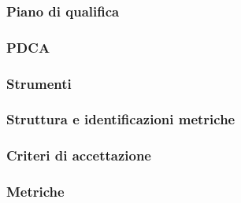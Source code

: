 \subsubsection{Piano di qualifica}
\subsubsection{PDCA}
\subsubsection{Strumenti}
\subsubsection{Struttura e identificazioni metriche}
\subsubsection{Criteri di accettazione}
\subsubsection{Metriche}
